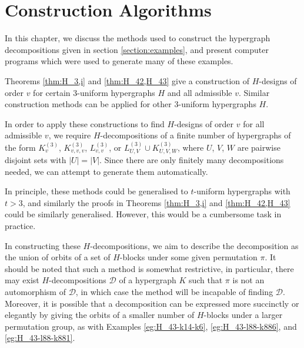 \section{Construction Algorithms}

In this chapter, we discuss the methods used to construct the hypergraph decompositions given in section \ref{section:examples}, and present computer programs which were used to generate many of these examples.

Theorems \ref{thm:H_3,i} and \ref{thm:H_42,H_43} give a construction of $H$-designs of order $v$ for certain $3$-uniform hypergraphs $H$ and all admissible $v$.
Similar construction methods can be applied for other $3$-uniform hypergraphs $H$.

In order to apply these constructions to find $H$-designs of order $v$ for all admissible $v$, we require $H$-decompositions of a finite number of hypergraphs of the form $K_{v}^{(3)}$, $K_{v,v,v}^{(3)}$, $L_{v,v}^{(3)}$, or $L_{U, V}^{(3)} \cup K_{U, V, W}^{(3)}$, where $U$, $V$, $W$ are pairwise disjoint sets with $|U| = |V|$.
Since there are only finitely many decompositions needed, we can attempt to generate them automatically.

In principle, these methods could be generalised to $t$-uniform hypergraphs with $t > 3$, and similarly the proofs in Theorems \ref{thm:H_3,i} and \ref{thm:H_42,H_43} could be similarly generalised. However, this would be a cumbersome task in practice.

In constructing these $H$-decompositions, we aim to describe the decomposition as the union of orbits of a set of $H$-blocks under some given permutation $\pi$.
It should be noted that such a method is somewhat restrictive, in particular, there may exist $H$-decompositions $\mathcal{D}$ of a hypergraph $K$ such that $\pi$ is not an automorphism of $\mathcal{D}$, in which case the method will be incapable of finding $\mathcal{D}$.
Moreover, it is possible that a decomposition can be expressed more succinctly or elegantly by giving the orbits of a smaller number of $H$-blocks under a larger permutation group, as with Examples \ref{eg:H_43-k14-k6}, \ref{eg:H_43-l88-k886}, and \ref{eg:H_43-l88-k881}.


